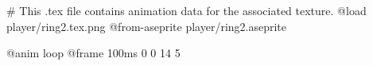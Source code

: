 # This .tex file contains animation data for the associated texture.
@load player/ring2.tex.png
@from-aseprite player/ring2.aseprite

@anim loop
	@frame 100ms 0 0 14 5
